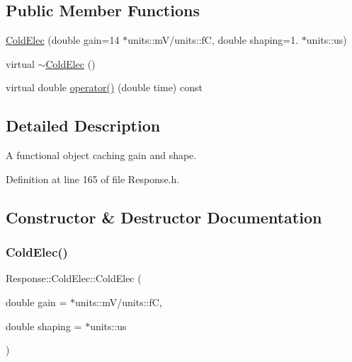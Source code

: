 \subsection*{Public Member Functions}
\begin{DoxyCompactItemize}
\item 
\hyperlink{class_wire_cell_1_1_response_1_1_cold_elec_a76be57b8cb61343bb7f643d2ab741e67}{Cold\+Elec} (double gain=14 $\ast$units\+::mV/units\+::fC, double shaping=1. $\ast$units\+::us)
\item 
virtual \hyperlink{class_wire_cell_1_1_response_1_1_cold_elec_aa62302560d96329266f70e331350a957}{$\sim$\+Cold\+Elec} ()
\item 
virtual double \hyperlink{class_wire_cell_1_1_response_1_1_cold_elec_a488dd88ca0566ba96fbd9df9c6d3e9b7}{operator()} (double time) const
\end{DoxyCompactItemize}


\subsection{Detailed Description}
A functional object caching gain and shape. 

Definition at line 165 of file Response.\+h.



\subsection{Constructor \& Destructor Documentation}
\mbox{\label{class_wire_cell_1_1_response_1_1_cold_elec_a76be57b8cb61343bb7f643d2ab741e67}} 
\subsubsection{\texorpdfstring{Cold\+Elec()}{ColdElec()}}
{\footnotesize\ttfamily Response\+::\+Cold\+Elec\+::\+Cold\+Elec (\begin{DoxyParamCaption}\item[{double}]{gain = {$\ast$units\+:\+:mV/units\+:\+:fC},  }\item[{double}]{shaping = {$\ast$units\+:\+:us} }\end{DoxyParamCaption})}



